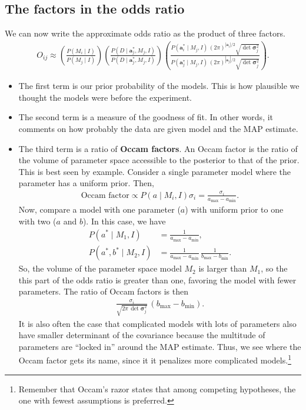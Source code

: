 \subsection{The factors in the odds ratio}
We can now write the approximate odds ratio as the product of three
factors.
\begin{align}
O_{ij} \approx \left(\frac{P(M_i\mid I)}{P(M_j\mid I)}\right)
\left(\frac{P(D\mid \mathbf{a}_j^*, M_j, I)}{P(D\mid \mathbf{a}_j^*, M_j, I)}\right)
\left(\frac{P(\mathbf{a}_i^*\mid M_j, I)\,\left(2\pi\right)^{|\mathbf{a}_i|/2}\sqrt{\det\boldsymbol{\sigma}_j^2}}
{P(\mathbf{a}_j^*\mid M_j, I)\,\left(2\pi\right)^{|\mathbf{a}_j|/2}\sqrt{\det\boldsymbol{\sigma}_j^2}}\right).
\end{align}
\begin{itemize}
\item The first term is our prior probability of the models.  This is
  how plausible we thought the models were before the experiment.
\item The second term is a measure of the goodness of fit.  In other
  words, it comments on how probably the data are given model and the
  MAP estimate.
\item The third term is a ratio of \textbf{Occam factors}.  An Occam
  factor is the ratio of the volume of parameter space accessible to
  the posterior to that of the prior.  This is best seen by example.
  Consider a single parameter model where the parameter has a uniform
  prior.  Then,
  \begin{align}
    \text{Occam factor} \propto P(a\mid M_i, I) \sigma_i = \frac{\sigma_i}{a_\mathrm{max} - a_\mathrm{min}}.
  \end{align}
  Now, compare a model with one parameter ($a$) with uniform prior to
  one with two ($a$ and $b$).  In this case, we have
  \begin{align}
    P(a^*\mid M_1,I) &= \frac{1}{a_\mathrm{max} - a_\mathrm{min}}, \\
    P(a^*, b^*\mid M_2,I) &= \frac{1}{a_\mathrm{max} - a_\mathrm{min}}\,
                            \frac{1}{b_\mathrm{max} - b_\mathrm{min}}.
  \end{align}
  So, the volume of the parameter space model $M_2$ is larger than
  $M_1$, so the this part of the odds ratio is greater than one,
  favoring the model with fewer parameters.  The ratio of Occam
  factors is then
  \begin{align}
    \frac{\sigma_i}{\sqrt{2\pi \,\det \boldsymbol{\sigma}_j^2}}\, (b_\mathrm{max} - b_\mathrm{min}).
  \end{align}
  It is also often the case that complicated models with lots of
  parameters also have smaller determinant of the covariance because
  the multitude of parameters are ``locked in'' around the MAP
  estimate.  Thus, we see where the Occam factor gets its name, since
  it it penalizes more complicated models.\footnote{Remember that
    Occam's razor states that among competing hypotheses, the one with
    fewest assumptions is preferred.}
\end{itemize}

